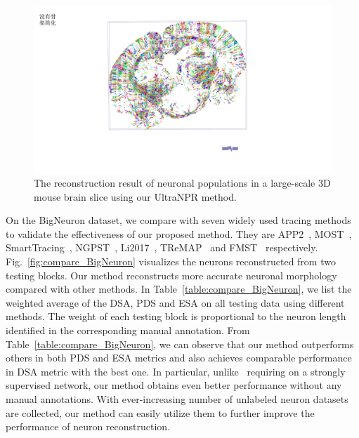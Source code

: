 \begin{figure}[t]
	\centering
	\includegraphics[width=1\columnwidth]{./Illustrations/brain_slice.pdf}
	\caption{The reconstruction result of neuronal populations in a large-scale 3D mouse brain slice using our UltraNPR method.}
	\label{fig:reconstruct_brain}
\end{figure}


On the BigNeuron dataset, we compare with seven widely used tracing methods to validate the effectiveness of our proposed method.
They are APP2~\cite{Xiao2013}, MOST~\cite{Wu2014}, SmartTracing~\cite{Chen2015}, NGPST~\cite{Quan2015}, Li2017~\cite{Li2017}, TReMAP~\cite{Zhou2016} and FMST~\cite{Yang2019} respectively.
Fig.~\ref{fig:compare_BigNeuron} visualizes the neurons reconstructed from two testing blocks.
Our method reconstructs more accurate neuronal morphology compared with other methods.
In Table~\ref{table:compare_BigNeuron}, we list the weighted average of the DSA, PDS and ESA on all testing data using different methods.
The weight of each testing block is proportional to the neuron length identified in the corresponding manual annotation.
From Table~\ref{table:compare_BigNeuron}, we can observe that our method outperforms others in both PDS and ESA metrics and also achieves comparable performance in DSA metric with the best one.
In particular, unlike~\cite{Li2017} requiring on a strongly supervised network, our method obtains even better performance without any manual annotations.
With ever-increasing number of unlabeled neuron datasets are collected, our method can easily utilize them to further improve the performance of neuron reconstruction.


